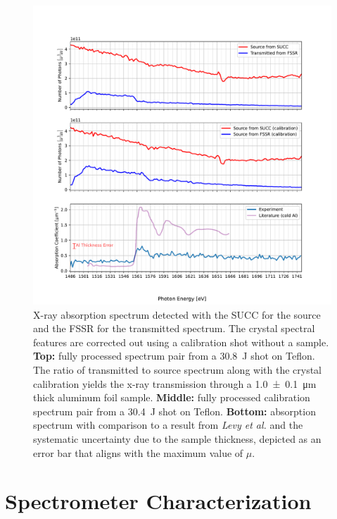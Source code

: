 \begin{figure}[H]
	\centering
	\includegraphics[width=\textwidth]{Data_Analysis/absorption/absorption_spectrum_of_PTFE_event_74_on_FSSR.pdf}
	\caption{X-ray absorption spectrum detected with the SUCC for the source and the FSSR for the transmitted spectrum. The crystal spectral features are corrected out using a calibration shot without a sample. \textbf{Top:} fully processed spectrum pair from a \SI{30.8}{\joule} shot on Teflon. The ratio of transmitted to source spectrum along with the crystal calibration yields the x-ray transmission through a \SI{1.0\pm0.1}{\micro\meter} thick aluminum foil sample. \textbf{Middle:} fully processed calibration spectrum pair from a \SI{30.4}{\joule} shot on Teflon. \textbf{Bottom:} absorption spectrum with comparison to a result from \textit{Levy et al.} \citep{levy2010double} and the systematic uncertainty due to the sample thickness, depicted as an error bar that aligns with the maximum value of $\mu$.}
	\label{fig: FSSR absorption}
\end{figure}


\section{Spectrometer Characterization}
\label{section: spectrometer characterization}


